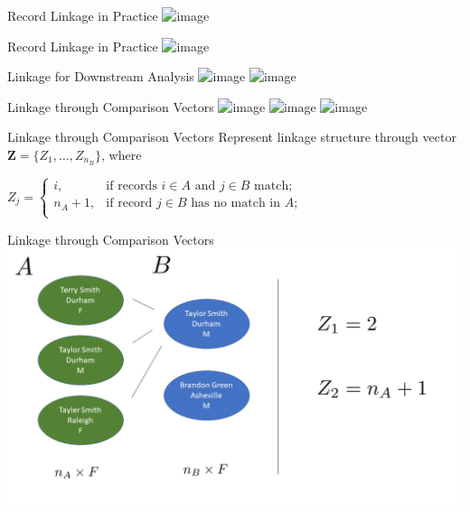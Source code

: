 \documentclass{beamer}
\begin{document}
\begin{frame}{Record Linkage in Practice}
	\centering
	\includegraphics<1->[width = .8\textwidth, height = .6\textwidth ]{graphics/syria_article_big.png}
\end{frame}

\begin{frame}{Record Linkage in Practice}
	\includegraphics<1->[width = \textwidth, height = .6\textwidth ]{graphics/dnc_big.png}
\end{frame}

\begin{frame}{Linkage for Downstream Analysis}
	\includegraphics<1>[width = \textwidth, height = .7\textwidth ]{graphics/Slide1.png}
	\includegraphics<2>[width = \textwidth, height = .7\textwidth ]{graphics/Slide2.png}
\end{frame}

\begin{frame}{Linkage through Comparison Vectors}
	\includegraphics<1>[width = \textwidth, height = .6\textwidth ]{graphics/Slide3.png}
	\includegraphics<2>[width = \textwidth, height = .6\textwidth ]{graphics/Slide4.png}
	\includegraphics<3>[width = \textwidth, height = .6\textwidth ]{graphics/Slide5.png}
\end{frame}

\begin{frame}{Linkage through Comparison Vectors}
	Represent linkage structure through vector $\mathbf{Z} = \{Z_1, \ldots, Z_{n_B}\}$, where
\begin{center}
	$Z_j = \begin{cases} 
		i,  & \text{if records } i\in A \text{ and } j\in B \text{ match}; \\
		n_A + 1,  & \text{if record } j\in B \text{ has no match in } A; \\
	\end{cases}$
\end{center}
\end{frame}

\begin{frame}{Linkage through Comparison Vectors}
	\includegraphics[width = \textwidth, height = .6\textwidth ]{graphics/Slide6.png}
\end{frame}
\end{document}
